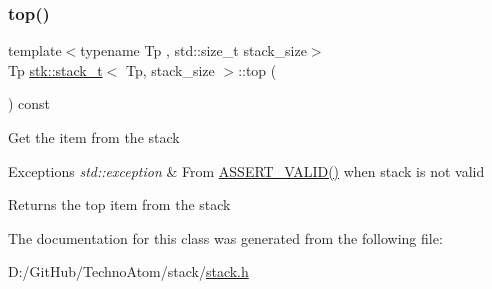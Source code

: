 \subsubsection{\texorpdfstring{top()}{top()}}
{\footnotesize\ttfamily template$<$typename Tp , std\+::size\+\_\+t stack\+\_\+size$>$ \\
Tp \hyperlink{classstk_1_1stack__t}{stk\+::stack\+\_\+t}$<$ Tp, stack\+\_\+size $>$\+::top (\begin{DoxyParamCaption}{ }\end{DoxyParamCaption}) const}

Get the item from the stack 
\begin{DoxyExceptions}{Exceptions}
{\em std\+::exception} & From \hyperlink{stack_8h_a4ad7af85cae2910ffcf6bfbcb8278886}{A\+S\+S\+E\+R\+T\+\_\+\+V\+A\+L\+I\+D()} when stack is not valid \\
\hline
\end{DoxyExceptions}
\begin{DoxyReturn}{Returns}
the top item from the stack 
\end{DoxyReturn}


The documentation for this class was generated from the following file\+:\begin{DoxyCompactItemize}
\item 
D\+:/\+Git\+Hub/\+Techno\+Atom/stack/\hyperlink{stack_8h}{stack.\+h}\end{DoxyCompactItemize}
